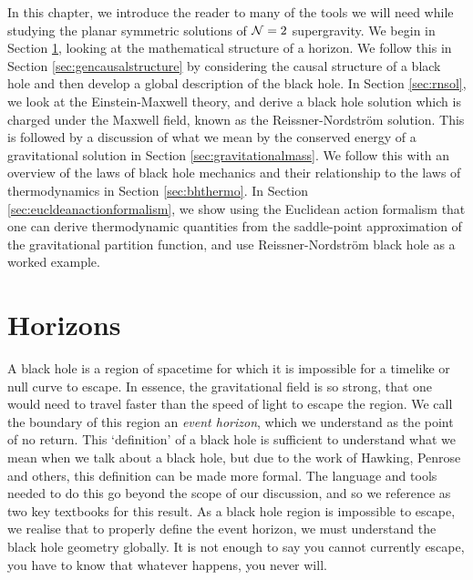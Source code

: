 In this chapter, we introduce the reader to many of the tools we will need while studying the planar symmetric solutions of ${\cal N} = 2$ supergravity. We begin in Section \ref{sec:horizons}, looking at the mathematical structure of a horizon. We follow this in Section \ref{sec:gencausalstructure} by considering the causal structure of a black hole and then develop a global description of the \sch black hole. In Section \ref{sec:rnsol}, we look at the Einstein-Maxwell theory, and derive a black hole solution which is charged under the Maxwell field, known as the Reissner-Nordstr\"om solution. This is followed by a discussion of what we mean by the conserved energy of a gravitational solution in Section \ref{sec:gravitationalmass}. We follow this with an overview of the laws of black hole mechanics and their relationship to the laws of thermodynamics in Section \ref{sec:bhthermo}. In Section \ref{sec:eucldeanactionformalism}, we show using the Euclidean action formalism that one can derive thermodynamic quantities from the saddle-point approximation of the gravitational partition function, and use Reissner-Nordstr\"om black hole as a worked example.


\section{Horizons}
\label{sec:horizons}

A black hole is a region of spacetime for which it is impossible for a timelike or null curve to escape. In essence, the gravitational field is so strong, that one would need to travel faster than the speed of light to escape the region. We call the boundary of this region an \emph{event horizon}, which we understand as the point of no return. This `definition' of a black hole is sufficient to understand what we mean when we talk about a black hole, but due to the work of Hawking, Penrose and others, this definition can be made more formal. The language and tools needed to do this go beyond the scope of our discussion, and so we reference \cite{Hawking:1973uf, Wald:106274} as two key textbooks for this result. As a black hole region is impossible to escape, we realise that to properly define the event horizon, we must understand the black hole geometry globally. It is not enough to say you cannot currently escape, you have to know that whatever happens, you never will.

